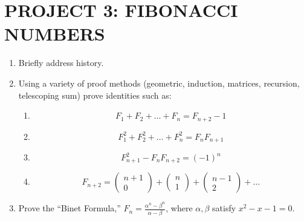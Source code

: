 \documentclass{article}
\begin{document}
\section[PROJECT 3: FIBONACCI NUMBERS]{PROJECT 3: FIBONACCI NUMBERS}
\begin{enumerate}
\item Briefly address history. 
\item Using a variety of proof methods (geometric, induction, matrices, recursion, telescoping sum) prove identities
such as:

\begin{enumerate}
\item \begin{equation*}
F_1+F_2+{\dots}+F_n=F_{n+2}-1
\end{equation*}
\item \begin{equation*}
F_1^2+F_2^2+{\dots}+F_n^2=F_nF_{n+1}
\end{equation*}
\item \begin{equation*}
F_{n+1}^2-F_nF_{n+2}=\left(-1\right)^n
\end{equation*}
\item \begin{equation*}
F_{n+2}=\left(\begin{matrix}n+1\\0\end{matrix}\right)+\left(\begin{matrix}n\\1\end{matrix}\right)+\left(\begin{matrix}n-1\\2\end{matrix}\right)+{\dots}
\end{equation*}
\end{enumerate}
\item Prove the “Binet Formula,”  $F_n=\frac{\alpha ^n-\beta ^n}{\alpha -\beta }$, where  $\alpha ,\beta $ satisfy 
$x^2-x-1=0$.  


\end{enumerate}
\end{document}
